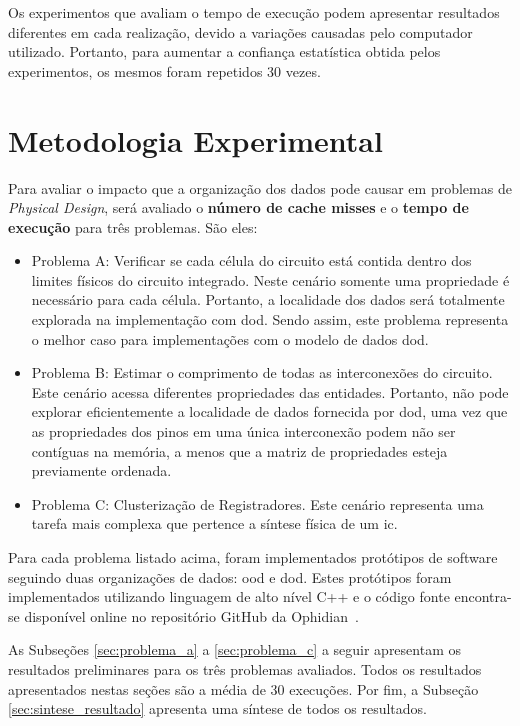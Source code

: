 Os experimentos que avaliam o tempo de execução podem apresentar resultados diferentes em cada realização, devido a variações causadas pelo computador utilizado. Portanto, para aumentar a confiança estatística obtida pelos experimentos, os mesmos foram repetidos 30 vezes.%

\section{Metodologia Experimental}
\label{sec:metodologia_experimental}

Para avaliar o impacto que a organização dos dados pode causar em problemas de \textit{Physical Design}, será avaliado o \textbf{número de cache misses} e o \textbf{tempo de execução} para três problemas. São eles:
\begin{itemize}
    \item Problema A: Verificar se cada célula do circuito está contida dentro dos  limites físicos do circuito integrado. Neste cenário somente uma propriedade é necessário para cada célula. Portanto, a localidade dos dados será totalmente explorada na implementação com \ac{dod}. Sendo assim, este problema representa o melhor caso para implementações com o modelo de dados \ac{dod}.
    \item Problema B: Estimar o comprimento de todas as interconexões do circuito. Este cenário acessa diferentes propriedades das entidades. Portanto, não pode explorar eficientemente a localidade de dados fornecida por \ac {dod}, uma vez que as propriedades dos pinos em uma única interconexão podem não ser contíguas na memória, a menos que a matriz de propriedades esteja previamente ordenada.
    \item Problema C: Clusterização de Registradores. Este cenário representa uma tarefa mais complexa que pertence a síntese física de um \ac{ic}.
\end{itemize}

Para cada problema listado acima, foram implementados protótipos de software seguindo duas organizações de dados: \ac{ood} e \ac{dod}.
Estes protótipos foram implementados utilizando linguagem de alto nível C++ e o código fonte encontra-se disponível online no repositório GitHub da Ophidian~\cite{ophidian}.

As Subseções \ref{sec:problema_a} a \ref{sec:problema_c} a seguir apresentam os resultados preliminares para os três problemas avaliados.
Todos os resultados apresentados nestas seções são a média de 30 execuções.
Por fim, a Subseção \ref{sec:sintese_resultado} apresenta uma síntese de todos os resultados.

